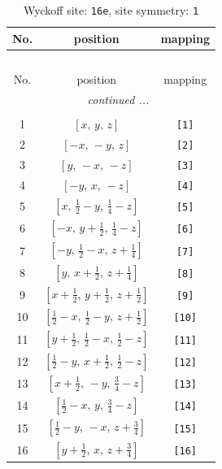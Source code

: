 \documentclass[fleqn,8pt]{jsarticle}
\begin{document}
\begin{longtable}{ccc}
\caption{Wyckoff site: {\tt 16e}, site symmetry: {\tt 1}}
 \\
 \hline \hline
No. & position & mapping \\ \hline \endfirsthead

\multicolumn{2}{l}{\tablename\ \thetable{}} \\
 \hline \hline
No. & position & mapping \\ \hline \endhead

 \hline \hline
\multicolumn{2}{r}{\footnotesize\it continued ...} \\ \endfoot

 \hline \hline
\multicolumn{2}{r}{} \\ \endlastfoot

1 & $\left[ x,\, y,\, z \right]$ & {\tt [1]} \\ \hline
2 & $\left[ - x,\, - y,\, z \right]$ & {\tt [2]} \\ \hline
3 & $\left[ y,\, - x,\, - z \right]$ & {\tt [3]} \\ \hline
4 & $\left[ - y,\, x,\, - z \right]$ & {\tt [4]} \\ \hline
5 & $\left[ x,\, \frac{1}{2} - y,\, \frac{1}{4} - z \right]$ & {\tt [5]} \\ \hline
6 & $\left[ - x,\, y + \frac{1}{2},\, \frac{1}{4} - z \right]$ & {\tt [6]} \\ \hline
7 & $\left[ - y,\, \frac{1}{2} - x,\, z + \frac{1}{4} \right]$ & {\tt [7]} \\ \hline
8 & $\left[ y,\, x + \frac{1}{2},\, z + \frac{1}{4} \right]$ & {\tt [8]} \\ \hline
9 & $\left[ x + \frac{1}{2},\, y + \frac{1}{2},\, z + \frac{1}{2} \right]$ & {\tt [9]} \\ \hline
10 & $\left[ \frac{1}{2} - x,\, \frac{1}{2} - y,\, z + \frac{1}{2} \right]$ & {\tt [10]} \\ \hline
11 & $\left[ y + \frac{1}{2},\, \frac{1}{2} - x,\, \frac{1}{2} - z \right]$ & {\tt [11]} \\ \hline
12 & $\left[ \frac{1}{2} - y,\, x + \frac{1}{2},\, \frac{1}{2} - z \right]$ & {\tt [12]} \\ \hline
13 & $\left[ x + \frac{1}{2},\, - y,\, \frac{3}{4} - z \right]$ & {\tt [13]} \\ \hline
14 & $\left[ \frac{1}{2} - x,\, y,\, \frac{3}{4} - z \right]$ & {\tt [14]} \\ \hline
15 & $\left[ \frac{1}{2} - y,\, - x,\, z + \frac{3}{4} \right]$ & {\tt [15]} \\ \hline
16 & $\left[ y + \frac{1}{2},\, x,\, z + \frac{3}{4} \right]$ & {\tt [16]} \\
\end{longtable}
\end{document}
